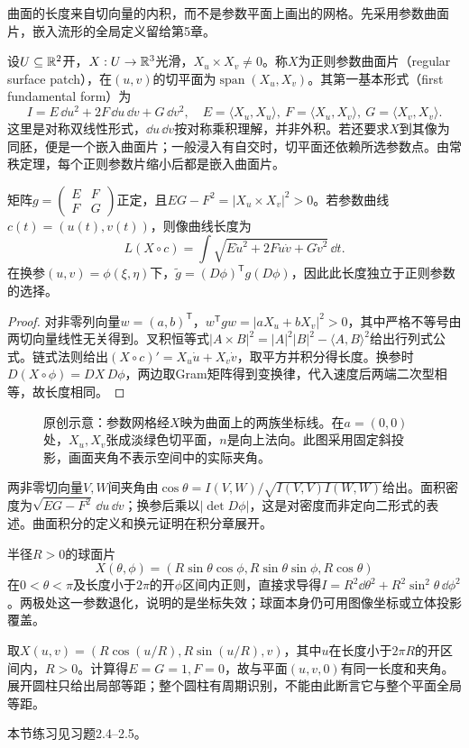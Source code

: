 曲面的长度来自切向量的内积，而不是参数平面上画出的网格。先采用参数曲面片，嵌入流形的全局定义留给第5章。
\begin{definition}[正则曲面片与诱导度量]
设$U\subseteq\mathbb{R}^2$开，$X:U\to\mathbb{R}^3$光滑，$X_u\times X_v\ne0$。称$X$为正则参数曲面片（regular surface patch），在$(u,v)$的切平面为$\operatorname{span}(X_u,X_v)$。其第一基本形式（first fundamental form）为
\[
 I=E\,\dd u^2+2F\,\dd u\,\dd v+G\,\dd v^2,\quad
 E=\langle X_u,X_u\rangle,\ F=\langle X_u,X_v\rangle,\ G=\langle X_v,X_v\rangle.
\]
这里是对称双线性形式，$\dd u\,\dd v$按对称乘积理解，并非外积。若还要求$X$到其像为同胚，便是一个嵌入曲面片；一般浸入有自交时，切平面还依赖所选参数点。由常秩定理，每个正则参数片缩小后都是嵌入曲面片。
\end{definition}
\begin{theorem}\label{thm:first-form}
矩阵$g=\left(\begin{smallmatrix}E&F\\F&G\end{smallmatrix}\right)$正定，且$EG-F^2=|X_u\times X_v|^2>0$。若参数曲线$c(t)=(u(t),v(t))$，则像曲线长度为
\[
 L(X\circ c)=\int\sqrt{E\dot u^2+2F\dot u\dot v+G\dot v^2}\,\dd t.
\]
在换参$(u,v)=\phi(\xi,\eta)$下，$\widetilde g=(D\phi)^{\mathsf T}g(D\phi)$，因此此长度独立于正则参数的选择。
\end{theorem}
\begin{proof}
对非零列向量$w=(a,b)^{\mathsf T}$，$w^{\mathsf T}gw=|aX_u+bX_v|^2>0$，其中严格不等号由两切向量线性无关得到。叉积恒等式$|A\times B|^2=|A|^2|B|^2-\langle A,B\rangle^2$给出行列式公式。链式法则给出$(X\circ c)'=X_u\dot u+X_v\dot v$，取平方并积分得长度。换参时$D(X\circ\phi)=DX\,D\phi$，两边取Gram矩阵得到变换律，代入速度后两端二次型相等，故长度相同。
\end{proof}
\begin{figure}[htbp]
\centering

\caption{原创示意：参数网格经$X$映为曲面上的两族坐标线。在$a=(0,0)$处，$X_u,X_v$张成淡绿色切平面，$n$是向上法向。此图采用固定斜投影，画面夹角不表示空间中的实际夹角。}
\label{fig:surface-patch}
\end{figure}
两非零切向量$V,W$间夹角由$\cos\theta=I(V,W)/\sqrt{I(V,V)I(W,W)}$给出。面积密度为$\sqrt{EG-F^2}\,\dd u\,\dd v$；换参后乘以$|\det D\phi|$，这是对密度而非定向二形式的表述。曲面积分的定义和换元证明在积分章展开。
\begin{example}[球面极坐标与坐标奇点]
半径$R>0$的球面片
\[
 X(\theta,\phi)=(R\sin\theta\cos\phi,R\sin\theta\sin\phi,R\cos\theta)
\]
在$0<\theta<\pi$及长度小于$2\pi$的开$\phi$区间内正则，直接求导得$I=R^2\dd\theta^2+R^2\sin^2\theta\,\dd\phi^2$。两极处这一参数退化，说明的是坐标失效；球面本身仍可用图像坐标或立体投影覆盖。
\end{example}
\begin{example}[圆柱与平面的局部等距]\label{ex:cylinder-isometry}
取$X(u,v)=(R\cos(u/R),R\sin(u/R),v)$，其中$u$在长度小于$2\pi R$的开区间内，$R>0$。计算得$E=G=1,F=0$，故与平面$(u,v,0)$有同一长度和夹角。展开圆柱只给出局部等距；整个圆柱有周期识别，不能由此断言它与整个平面全局等距。
\end{example}
本节练习见习题2.4--2.5。

